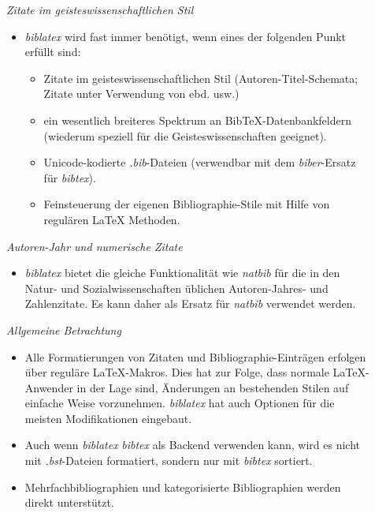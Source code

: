 \begin{description}
	\item[] \emph{Zitate im geisteswissenschaftlichen Stil}
	\begin{itemize}
		\item \emph{biblatex} wird fast immer benötigt, wenn eines der folgenden Punkt erfüllt sind:
		\begin{itemize}
			\item Zitate im geisteswissenschaftlichen Stil (Autoren-Titel-Schemata; Zitate unter Verwendung von ebd. usw.)
			\item ein wesentlich breiteres Spektrum an BibTeX-Datenbankfeldern (wiederum speziell für die Geisteswissenschaften geeignet).
			\item Unicode-kodierte \emph{.bib}-Dateien (verwendbar mit dem \emph{biber}-Ersatz für \emph{bibtex}).
			\item Feinsteuerung der eigenen Bibliographie-Stile mit Hilfe von regulären \LaTeX{} Methoden.
		\end{itemize}
	\end{itemize}
	\item[] \emph{Autoren-Jahr und numerische Zitate}
	\begin{itemize}
		\item \emph{biblatex} bietet die gleiche Funktionalität wie \emph{natbib} für die in den Natur- und Sozialwissenschaften üblichen Autoren-Jahres- und Zahlenzitate. Es kann daher als Ersatz für \emph{natbib} verwendet werden.
	\end{itemize}
	\item[] \emph{Allgemeine Betrachtung}
	\begin{itemize}
		\item Alle Formatierungen von Zitaten und Bibliographie-Einträgen erfolgen über reguläre LaTeX-Makros. Dies hat zur Folge, dass normale LaTeX-Anwender in der Lage sind, Änderungen an bestehenden Stilen auf einfache Weise vorzunehmen. \emph{biblatex} hat auch Optionen für die meisten Modifikationen eingebaut.
		\item Auch wenn \emph{biblatex} \emph{bibtex} als Backend verwenden kann, wird es nicht mit \emph{.bst}-Dateien formatiert, sondern nur mit \emph{bibtex} sortiert.
		\item Mehrfachbibliographien und kategorisierte Bibliographien werden direkt unterstützt.
	\end{itemize}
\end{description}

